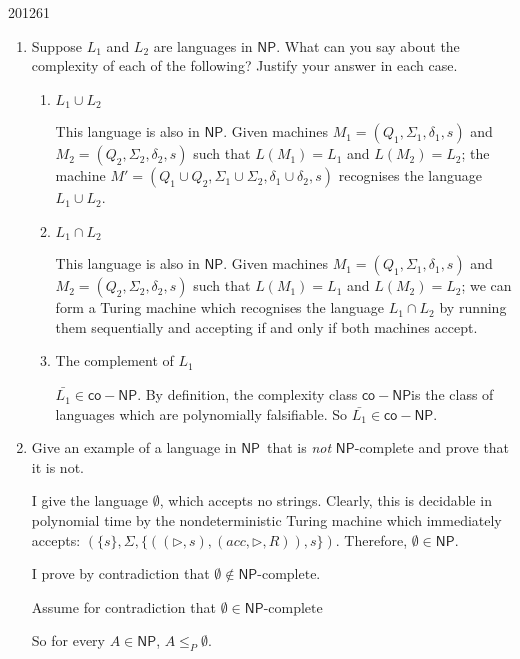 \documentclass[10pt,\jkfside,a4paper]{article}
\newcommand{\NP}{\ensuremath{\mathsf{NP}}}
\newcommand{\coNP}{\ensuremath{\mathsf{co-NP}}}
\begin{document}
\begin{examquestion}{2012}{6}{1}
\begin{enumerate}[label=(\alph*)]
\begin{enumerate}[label=(\roman*)]
\end{enumerate}

\item Suppose $L_1$ and $L_2$ are languages in \NP. What can you say about
the complexity of each of the following? Justify your answer in each case.

\begin{enumerate}[label=(\roman*)]

\item $L_1 \cup L_2$

This language is also in \NP. Given machines
$M_1 = (Q_1, \Sigma_1, \delta_1, s)$
and $M_2 = (Q_2, \Sigma_2, \delta_2, s)$ such that $L(M_1) = L_1$ and
$L(M_2) = L_2$; the machine $M' = (Q_1 \cup Q_2, \Sigma_1 \cup \Sigma_2,
\delta_1 \cup \delta_2, s)$ recognises the language $L_1 \cup L_2$.

\item $L_1 \cap L_2$

This language is also in \NP. Given machines
$M_1 = (Q_1, \Sigma_1, \delta_1, s)$
and $M_2 = (Q_2, \Sigma_2, \delta_2, s)$ such that $L(M_1) = L_1$ and
$L(M_2) = L_2$; we can form a Turing machine which recognises the language
$L_1 \cap L_2$ by running them sequentially and accepting if and only if
both machines accept.

\item The complement of $L_1$

$\bar{L_1} \in \coNP$. By definition, the complexity class \coNP is the
class of languages which are polynomially falsifiable. So $\bar{L_1} \in
\coNP$.

\end{enumerate}

\item Give an example of a language in \NP\ that is \textit{not} \NP-complete
and prove that it is not.

I give the language $\emptyset$, which accepts no strings. Clearly, this is
decidable in polynomial time by the nondeterministic Turing machine which
immediately accepts:
$(\{s\}, \Sigma, \{((\triangleright, s), (acc, \triangleright, R)), s\})$.
Therefore, $\emptyset \in \NP$.

I prove by contradiction that $\emptyset \notin \NP\text{-complete}$.

Assume for contradiction that $\emptyset \in \NP\text{-complete}$

So for every $A \in \NP$, $A \le_P \emptyset$.


\end{enumerate}
\end{examquestion}
\end{document}
